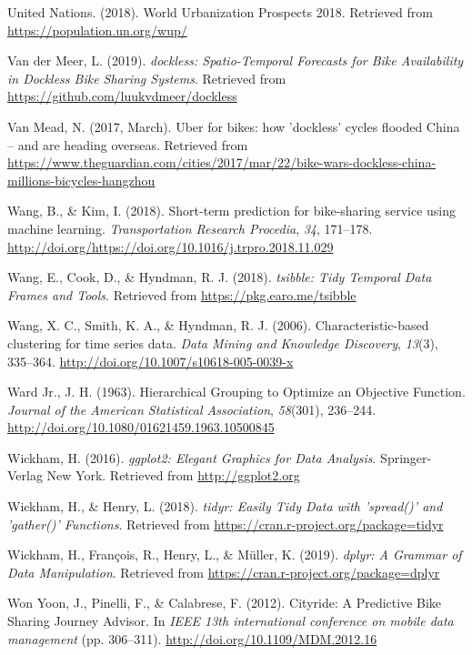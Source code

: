 \documentclass[12pt,oneside]{reedthesis}
\begin{document}
\hypertarget{ref-un2018}{}
United Nations. (2018). World Urbanization Prospects 2018. Retrieved
from \url{https://population.un.org/wup/}

\hypertarget{ref-dockless}{}
Van der Meer, L. (2019). \emph{dockless: Spatio-Temporal Forecasts for
Bike Availability in Dockless Bike Sharing Systems}. Retrieved from
\url{https://github.com/luukvdmeer/dockless}

\hypertarget{ref-guardian1}{}
Van Mead, N. (2017, March). Uber for bikes: how 'dockless' cycles
flooded China -- and are heading overseas. Retrieved from
\url{https://www.theguardian.com/cities/2017/mar/22/bike-wars-dockless-china-millions-bicycles-hangzhou}

\hypertarget{ref-wang2018}{}
Wang, B., \& Kim, I. (2018). Short-term prediction for bike-sharing
service using machine learning. \emph{Transportation Research Procedia},
\emph{34}, 171--178.
\url{http://doi.org/https://doi.org/10.1016/j.trpro.2018.11.029}

\hypertarget{ref-tsibble}{}
Wang, E., Cook, D., \& Hyndman, R. J. (2018). \emph{tsibble: Tidy
Temporal Data Frames and Tools}. Retrieved from
\url{https://pkg.earo.me/tsibble}

\hypertarget{ref-wang2006}{}
Wang, X. C., Smith, K. A., \& Hyndman, R. J. (2006).
Characteristic-based clustering for time series data. \emph{Data Mining
and Knowledge Discovery}, \emph{13}(3), 335--364.
\url{http://doi.org/10.1007/s10618-005-0039-x}

\hypertarget{ref-ward1963}{}
Ward Jr., J. H. (1963). Hierarchical Grouping to Optimize an Objective
Function. \emph{Journal of the American Statistical Association},
\emph{58}(301), 236--244.
\url{http://doi.org/10.1080/01621459.1963.10500845}

\hypertarget{ref-ggplot}{}
Wickham, H. (2016). \emph{ggplot2: Elegant Graphics for Data Analysis}.
Springer-Verlag New York. Retrieved from \url{http://ggplot2.org}

\hypertarget{ref-tidyr}{}
Wickham, H., \& Henry, L. (2018). \emph{tidyr: Easily Tidy Data with
'spread()' and 'gather()' Functions}. Retrieved from
\url{https://cran.r-project.org/package=tidyr}

\hypertarget{ref-dplyr}{}
Wickham, H., François, R., Henry, L., \& Müller, K. (2019). \emph{dplyr:
A Grammar of Data Manipulation}. Retrieved from
\url{https://cran.r-project.org/package=dplyr}

\hypertarget{ref-won2012}{}
Won Yoon, J., Pinelli, F., \& Calabrese, F. (2012). Cityride: A
Predictive Bike Sharing Journey Advisor. In \emph{IEEE 13th
international conference on mobile data management} (pp. 306--311).
\url{http://doi.org/10.1109/MDM.2012.16}
\end{document}
